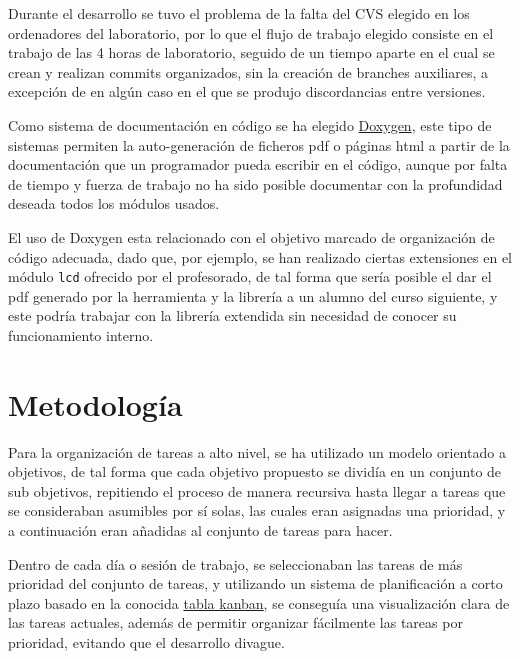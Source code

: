 \documentclass[12pt,letterpaper]{article}
\begin{document}
Durante el desarrollo se tuvo el problema de la falta del CVS elegido
en los ordenadores del laboratorio, por lo que el flujo de trabajo
elegido consiste en el trabajo de las 4 horas de laboratorio, seguido
de un tiempo aparte en el cual se crean y realizan commits
organizados, sin la creación de branches auxiliares, a excepción de en
algún caso en el que se produjo discordancias entre versiones.

Como sistema de documentación en código se ha elegido
\href{http://www.stack.nl/~dimitri/doxygen/}{Doxygen}, este tipo de
sistemas permiten la auto-generación de ficheros pdf o páginas html a
partir de la documentación que un programador pueda escribir en el
código, aunque por falta de tiempo y fuerza de trabajo no ha sido
posible documentar con la profundidad deseada todos los módulos
usados.

El uso de Doxygen esta relacionado con el objetivo marcado de
organización de código adecuada, dado que, por ejemplo, se han
realizado ciertas extensiones en el módulo \texttt{lcd} ofrecido por
el profesorado, de tal forma que sería posible el dar el pdf generado
por la herramienta y la librería a un alumno del curso siguiente, y
este podría trabajar con la librería extendida sin necesidad de
conocer su funcionamiento interno.

\section{Metodología}
\label{sec:metodologias}

Para la organización de tareas a alto nivel, se ha utilizado un modelo
orientado a objetivos, de tal forma que cada objetivo propuesto se
dividía en un conjunto de sub objetivos, repitiendo el proceso de
manera recursiva hasta llegar a tareas que se consideraban asumibles
por sí solas, las cuales eran asignadas una prioridad, y a
continuación eran añadidas al conjunto de tareas para hacer.

Dentro de cada día o sesión de trabajo, se seleccionaban las tareas de
más prioridad del conjunto de tareas, y utilizando un sistema de
planificación a corto plazo basado en la conocida
\href{https://en.wikipedia.org/wiki/Kanban\_board}{tabla kanban}, se
conseguía una visualización clara de las tareas actuales, además de
permitir organizar fácilmente las tareas por prioridad, evitando que
el desarrollo divague.
\end{document}
